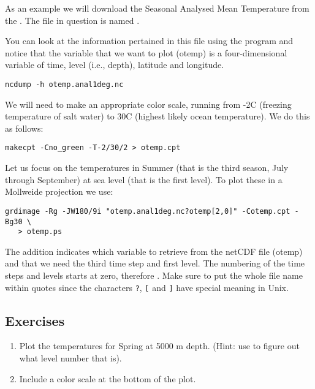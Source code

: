 \documentclass[11pt]{report}
\begin{document}
As an example we will download the Seasonal Analysed Mean Temperature from the
.
The file in question is named 
.

You can look at the information pertained in this file using the program  and
notice that the variable that we want to plot (otemp) is a four-dimensional variable of time,
level (i.e., depth), latitude and longitude.

{\small\begin{verbatim}
ncdump -h otemp.anal1deg.nc
\end{verbatim}
}

We will need to make an appropriate color scale, running from -2\DS C (freezing temperature of salt
water) to 30\DS C (highest likely ocean temperature). We do this as follows:

{\small\begin{verbatim}
makecpt -Cno_green -T-2/30/2 > otemp.cpt
\end{verbatim}
}

Let us focus on the temperatures in Summer (that is the third season, July through
September) at sea level (that is the first level). To plot these in a Mollweide projection we
use:

{\small\begin{verbatim}
grdimage -Rg -JW180/9i "otemp.anal1deg.nc?otemp[2,0]" -Cotemp.cpt -Bg30 \
   > otemp.ps
\end{verbatim}
}

The addition  indicates which variable to retrieve from the netCDF
file (otemp) and that we need the third time step and first level. The numbering of the
time steps and levels starts at zero, therefore \filename{[2,0]}. Make sure to put the
whole file name within quotes since the characters \verb|?|, \verb|[| and \verb|]| have
special meaning in Unix.

\subsection{Exercises}

\begin{enumerate}

\item Plot the temperatures for Spring at 5000 m depth. (Hint: use  to
figure out what level number that is).

\item Include a color scale at the bottom of the plot.

\end{enumerate}
\end{document}
